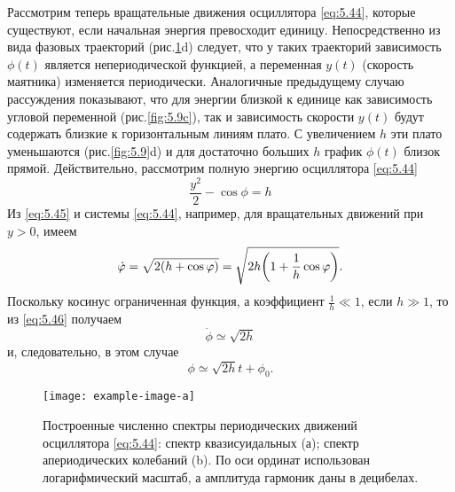 Рассмотрим теперь вращательные движения осциллятора \eqref{eq:5.44}, которые
существуют, если начальная энергия превосходит единицу. Непосредственно из
вида фазовых траекторий (рис.\ref{fig:5.10}d) следует, что у таких траекторий
зависимость $\phi(t)$ является непериодической функцией, а переменная $y(t)$
(скорость маятника) изменяется периодически. Аналогичные предыдущему
случаю рассуждения показывают, что для энергии близкой к единице как
зависимость угловой переменной (рис.\ref{fig:5.9c}), так и зависимость скорости $y(t)$
будут содержать близкие к горизонтальным линиям плато. С увеличением $h$ эти
плато уменьшаются (рис.\ref{fig:5.9}d) и для достаточно больших $h$ график $\phi(t)$ близок
прямой. Действительно, рассмотрим полную энергию осциллятора \eqref{eq:5.44}
\begin{equation}
        \label{eq:5.45}
        \frac{y^2}{2} - \cos \phi = h
\end{equation}
Из \eqref{eq:5.45} и системы \eqref{eq:5.44}, например, для вращательных движений при $y>0$, имеем
\begin{equation}
        \label{eq:5.46}
        \dot {\varphi} = \sqrt{ 2 \qty(h+ \cos \varphi)} = \sqrt{ 2h \qty( 1 + \frac{1}{h} \cos \varphi)}.
\end{equation}
Поскольку косинус ограниченная функция, а коэффициент $\frac{1}{h} \ll 1$, если $h \gg 1$,
то из \eqref{eq:5.46} получаем
\begin{equation}
        \label{eq:}
        \dot \phi \simeq \sqrt{2 h}
\end{equation}
и, следовательно, в этом случае
\begin{equation}
        \label{eq:}
        \phi \simeq \sqrt{2h} t + \phi_0.
\end{equation}

\begin{figure}[h]
        \centering
        \texttt{[image: example-image-a]}
        \caption{Построенные численно спектры периодических движений осциллятора \eqref{eq:5.44}:
        спектр квазисуидальных (а); спектр апериодических колебаний (b). 
По оси ординат использован логарифмический масштаб, а амплитуда гармоник даны в децибелах.}
        \label{fig:5.10}
\end{figure}

